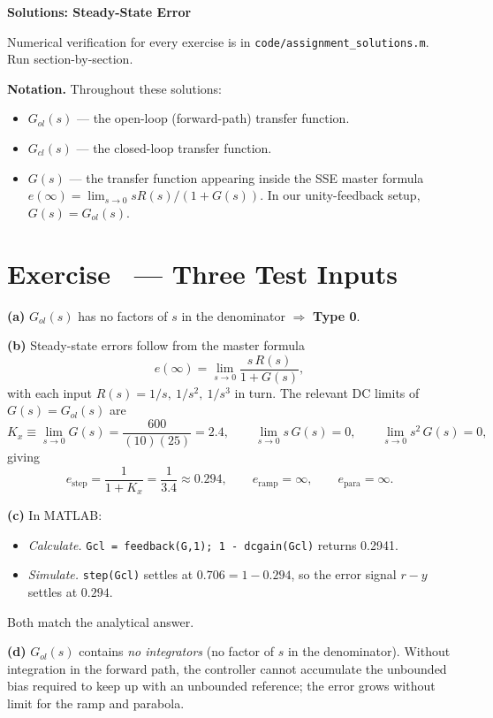 \documentclass[11pt]{article}
\newcounter{exercise}
\newcommand{\exercise}[1]{%
  \refstepcounter{exercise}%
  \section*{Exercise \theexercise\ --- #1}%
}
\begin{document}
\begin{center}
  \Large{\bf{Solutions: Steady-State Error}}
\end{center}

Numerical verification for every exercise is in
\texttt{code/assignment\_solutions.m}.  Run section-by-section.

\textbf{Notation.}  Throughout these solutions:
\begin{itemize}
  \item $G_{ol}(s)$ --- the open-loop (forward-path) transfer function.
  \item $G_{cl}(s)$ --- the closed-loop transfer function.
  \item $G(s)$ --- the transfer function appearing inside the SSE master
    formula $e(\infty) = \lim_{s \to 0} sR(s)/(1 + G(s))$.  In our
    unity-feedback setup, $G(s) = G_{ol}(s)$.
\end{itemize}

\exercise{Three Test Inputs}

\textbf{(a)}  $G_{ol}(s)$ has no factors of $s$ in the denominator
$\Rightarrow$ \textbf{Type 0}.

\textbf{(b)}  Steady-state errors follow from the master formula
\[
  e(\infty) = \lim_{s \to 0} \frac{s\,R(s)}{1 + G(s)},
\]
with each input $R(s) = 1/s,\ 1/s^2,\ 1/s^3$ in turn.  The relevant DC
limits of $G(s) = G_{ol}(s)$ are
\[
  K_x \equiv \lim_{s \to 0} G(s) = \frac{600}{(10)(25)} = 2.4,
  \qquad
  \lim_{s \to 0} s\,G(s) = 0,
  \qquad
  \lim_{s \to 0} s^2\,G(s) = 0,
\]
giving
\[
  e_\mathrm{step} = \frac{1}{1 + K_x} = \frac{1}{3.4} \approx \boxed{0.294},
  \qquad
  e_\mathrm{ramp} = \boxed{\infty},
  \qquad
  e_\mathrm{para} = \boxed{\infty}.
\]

\textbf{(c)}  In MATLAB:
\begin{itemize}
  \item \emph{Calculate.}  \texttt{Gcl = feedback(G,1); 1 - dcgain(Gcl)}
    returns 0.2941.
  \item \emph{Simulate.}  \texttt{step(Gcl)} settles at
    $0.706 = 1 - 0.294$, so the error signal $r - y$ settles at $0.294$.
\end{itemize}
Both match the analytical answer.

\textbf{(d)}  $G_{ol}(s)$ contains \emph{no integrators} (no factor of $s$
in the denominator).  Without integration in the forward path, the
controller cannot accumulate the unbounded bias required to keep up with
an unbounded reference; the error grows without limit for the ramp and
parabola.
\end{document}
